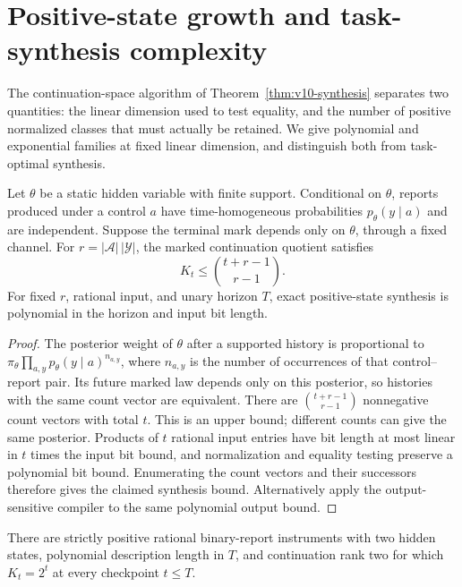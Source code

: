 \section{Positive-state growth and task-synthesis complexity}
\label{sec:v11-complexity}

The continuation-space algorithm of Theorem~\ref{thm:v10-synthesis}
separates two quantities: the linear dimension used to test equality,
and the number of positive normalized classes that must actually be
retained. We give polynomial and exponential families at fixed linear
dimension, and distinguish both from task-optimal synthesis.

\begin{proposition}
\label{prop:v11-counts}
Let $\theta$ be a static hidden variable with finite support. Conditional
on $\theta$, reports produced under a control $a$ have time-homogeneous
probabilities $p_\theta(y\mid a)$ and are independent. Suppose the terminal
mark depends only on $\theta$, through a fixed channel. For
$r=|\mathcal A|\,|\mathcal Y|$, the marked continuation quotient satisfies
\[
 K_t\le {t+r-1\choose r-1}.
\]
For fixed $r$, rational input, and unary horizon $T$, exact positive-state
synthesis is polynomial in the horizon and input bit length.
\end{proposition}

\begin{proof}
The posterior weight of $\theta$ after a supported history is proportional
to
$\pi_\theta\prod_{a,y}p_\theta(y\mid a)^{n_{a,y}}$, where
$n_{a,y}$ is the number of occurrences of that control--report pair.
Its future marked law depends only on this posterior, so histories with
the same count vector are equivalent. There are
${t+r-1\choose r-1}$ nonnegative count vectors with total $t$.
This is an upper bound; different counts can give the same posterior.
Products of $t$ rational input entries have bit length at most linear in
$t$ times the input bit bound, and normalization and equality testing
preserve a polynomial bit bound. Enumerating the count vectors and their
successors therefore gives the claimed synthesis bound. Alternatively
apply the output-sensitive compiler to the same polynomial output bound.
\end{proof}

\begin{proposition}
\label{prop:v11-exponential}
There are strictly positive rational binary-report instruments with two
hidden states, polynomial description length in $T$, and continuation
rank two for which $K_t=2^t$ at every checkpoint $t\le T$.
\end{proposition}

